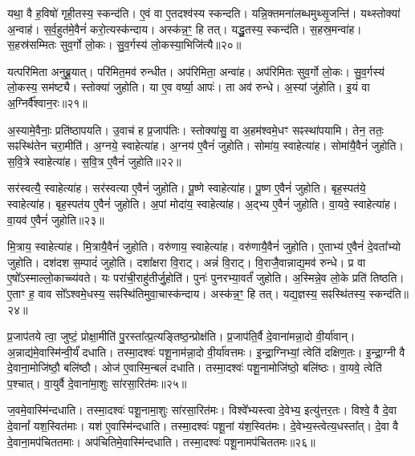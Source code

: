 यथा॒ वै ह॒विषो॑ गृही॒तस्य॒ स्कन्द॑ति।
ए॒वं वा ए॒तदश्व॑स्य स्कन्दति।
यन्नि॒क्तमना॑लब्धमुथ्सृ॒जन्ति॑।
यथ्स्तोक्या॑ अ॒न्वाह॑।
स॒र्व॒हुत॑मे॒वैनं॑ करो॒त्यस्क॑न्दाय।
अस्क॑न्न॒ꣳ॒ हि तत्।
यद्धु॒तस्य॒ स्कन्द॑ति।
स॒हस्र॒मन्वा॑ह।
स॒हस्र॑सम्मितः सुव॒र्गो लो॒कः।
सु॒व॒र्गस्य॑ लो॒कस्या॒भिजि॑त्यै॥२०॥\ip

यत्परि॑मिता अनुब्रू॒यात्।
परि॑मित॒मव॑ रुन्धीत।
अप॑रिमिता॒ अन्वा॑ह।
अप॑रिमितः सुव॒र्गो लो॒कः।
सु॒व॒र्गस्य॑ लो॒कस्य॒ सम॑ष्ट्यै।
स्तोक्या॑ जुहोति।
या ए॒व वर्ष्या॒ आपः॑।
ता अव॑ रुन्धे।
अ॒स्यां जु॑होति।
इ॒यं वा अ॒ग्निर्वै᳚श्वान॒रः॥२१॥\ip

अ॒स्यामे॒वैनाः॒ प्रति॑\-ष्ठापयति।
उ॒वाच॑ ह प्र॒जा\-प॑तिः।
स्तोक्या॑सु॒ वा अ॒हम॑श्वमे॒धꣳ सꣴस्था॑पयामि।
तेन॒ ततः॒ सꣴस्थि॑तेन चरा॒मीति॑।
अ॒ग्नये॒ स्वाहेत्या॑ह।
अ॒ग्नय॑ ए॒वैनं॑ जुहोति।
सोमा॑य॒ स्वाहेत्या॑ह।
सोमा॑यै॒वैनं॑ जुहोति।
स॒वि॒त्रे स्वाहेत्या॑ह।
स॒वि॒त्र ए॒वैनं॑ जुहोति॥२२॥\ip

सर॑स्वत्यै॒ स्वाहेत्या॑ह।
सर॑स्वत्या ए॒वैनं॑ जुहोति।
पू॒ष्णे स्वाहेत्या॑ह।
पू॒ष्ण ए॒वैनं॑ जुहोति।
बृह॒स्पत॑ये॒ स्वाहेत्या॑ह।
बृह॒स्पत॑य ए॒वैनं॑ जुहोति।
अ॒पां मोदा॑य॒ स्वाहेत्या॑ह।
अ॒द्भ्य ए॒वैनं॑ जुहोति।
वा॒यवे॒ स्वाहेत्या॑ह।
वा॒यव॑ ए॒वैनं॑ जुहोति॥२३॥\ip

मि॒त्राय॒ स्वाहेत्या॑ह।
मि॒त्रायै॒वैनं॑ जुहोति।
वरु॑णाय॒ स्वाहेत्या॑ह।
वरु॑णायै॒वैनं॑ जुहोति।
ए॒ताभ्य॑ ए॒वैनं॑ दे॒वता᳚भ्यो जुहोति।
दश॑दश स॒म्पादं॑ जुहोति।
दशा᳚क्षरा वि॒राट्।
अन्नं॑ वि॒राट्।
वि॒राजै॒वान्नाद्य॒मव॑ रुन्धे।
प्र वा ए॒षो᳚\-ऽस्माल्लो॒काच्च्य॑वते।
यः परा॑ची॒राहु॑तीर्जु॒होति॑।
पुनः॑ पुनरभ्या॒वर्तं॑ जुहोति।
अ॒स्मिन्ने॒व लो॒के प्रति॑ तिष्ठति।
ए॒ताꣳ ह॒ वाव सो᳚\-ऽश्वमे॒धस्य॒ सꣴस्थि॑तिमुवा॒चास्क॑न्दाय।
अस्क॑न्न॒ꣳ॒ हि तत्।
यद्य॒ज्ञस्य॒ सꣴस्थि॑तस्य॒ स्कन्द॑ति॥२४॥\ip\anuvakamend[अ॒भिजि॑त्यै वैश्वान॒रः स॑वि॒त्र ए॒वैनं॑ जुहोति वा॒यव॑ ए॒वैनं॑ जुहोति च्यवते॒ षट् च॑]

प्र॒जा\-प॑तये त्वा॒ जुष्टं॒ प्रोक्षा॒मीति॑ पु॒रस्ता᳚त्प्र॒त्यङ्तिष्ठ॒न्प्रोक्ष॑ति।
प्र॒जा\-प॑ति॒र्वै दे॒वाना॑मन्ना॒दो वी॒र्या॑वान्।
अ॒न्नाद्य॑मे॒वास्मि॑न्वी॒र्यं॑ दधाति।
तस्मा॒दश्वः॑ पशू॒नाम॑न्ना॒दो वी॒र्या॑वत्तमः।
इ॒न्द्रा॒ग्निभ्यां॒ त्वेति॑ दक्षिण॒तः।
इ॒न्द्रा॒ग्नी वै दे॒वाना॒मोजि॑ष्ठौ॒ बलि॑ष्ठौ।
ओज॑ ए॒वास्मि॒न्बलं॑ दधाति।
तस्मा॒दश्वः॑ पशू॒नामोजि॑ष्ठो॒ बलि॑ष्ठः।
वा॒यवे॒ त्वेति॑ प॒श्चात्।
वा॒युर्वै दे॒वाना॑मा॒शुः सा॑रसा॒रित॑मः॥२५॥\ip

ज॒वमे॒वास्मि॑न्दधाति।
तस्मा॒दश्वः॑ पशू॒नामा॒शुः सा॑रसा॒रित॑मः।
विश्वे᳚भ्यस्त्वा दे॒वेभ्य॒ इत्यु॑त्तर॒तः।
विश्वे॒ वै दे॒वा दे॒वानां᳚ यश॒स्वित॑माः।
यश॑ ए॒वास्मि॑न्दधाति।
तस्मा॒दश्वः॑ पशू॒नां य॑श॒स्वित॑मः।
दे॒वेभ्य॒स्त्वेत्य॒धस्ता᳚त्।
दे॒वा वै दे॒वाना॒मप॑चिततमाः।
अप॑चितिमे॒वास्मि॑न्दधाति।
तस्मा॒दश्वः॑ पशू॒नामप॑चिततमः॥२६॥\ip

